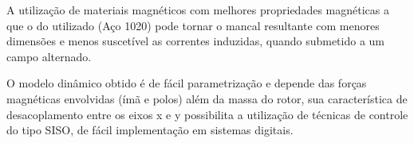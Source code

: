 A utilização de materiais magnéticos com melhores propriedades magnéticas a que o do utilizado (Aço 1020) pode tornar o mancal resultante com menores dimensões e menos suscetível as correntes induzidas, quando submetido a um campo alternado. 

O modelo dinâmico obtido é de fácil parametrização e depende das forças magnéticas envolvidas (ímã e polos) além da massa do rotor, sua característica de desacoplamento entre os eixos x e y possibilita a utilização de técnicas de controle do tipo SISO, de fácil implementação em sistemas digitais.











